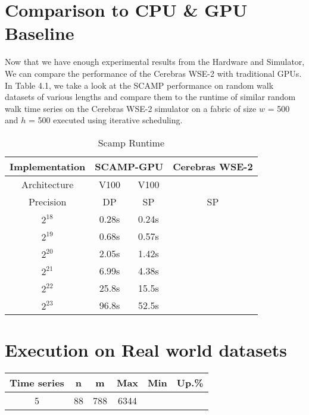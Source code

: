 \section{Comparison to CPU \& GPU Baseline}

Now that we have enough experimental results from the Hardware and Simulator, We can compare the performance of the Cerebras WSE-2 with traditional GPUs. In Table 4.1, we take a look at the SCAMP performance on random walk datasets of various lengths \cite{4} and compare them to the runtime of similar random walk time series on the Cerebras WSE-2 simulator on a fabric of size $w$ = 500 and $h$ = 500 executed using iterative scheduling.


\begin{table}[h!]
    \centering
    \renewcommand{\arraystretch}{1.25} %
    \caption{Scamp Runtime}
    \begin{tabular}{|| c | c | c | c ||} 
        \hline
        Implementation & \multicolumn{2}{c||}{SCAMP-GPU} & Cerebras WSE-2 \\ [0.5ex] 
        \hline
        Architecture & V100 & V100 & \\
        \hline
        Precision & DP & SP & SP \\
        \hline\hline
        $2^{18}$ & 0.28s & 0.24s & \\
        \hline
        $2^{19}$ & 0.68s & 0.57s & \\
        \hline
        $2^{20}$ & 2.05s & 1.42s & \\
        \hline
        $2^{21}$ & 6.99s & 4.38s & \\
        \hline
        $2^{22}$ & 25.8s & 15.5s & \\
        \hline
        $2^{23}$ & 96.8s & 52.5s & \\
        \hline
    \end{tabular}
\end{table}



\section{Execution on Real world datasets}

\begin{center}
    \begin{tabular}{c c c c c c} 
     \hline
     Time series & n & m & Max & Min & Up.\% \\ [0.5ex] 
     \hline
     5 & 88 & 788 & 6344 \\ [1ex] 
     \hline
    \end{tabular}
\end{center}

